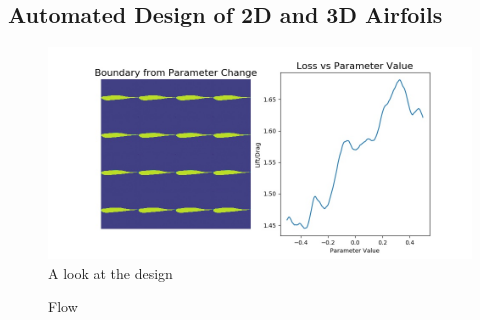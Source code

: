 \documentclass{article} %
\begin{document}
\subsection{Automated Design of 2D and 3D Airfoils}

\begin{figure}[h]
\begin{center}
\includegraphics[scale=0.27]{../test/figs/boundary_space_explore.jpeg}
\end{center}
\caption{A look at the design }
\end{figure}

\begin{figure}[h]
\begin{center}
\end{center}
\caption{Flow}
\end{figure}
\end{document}
